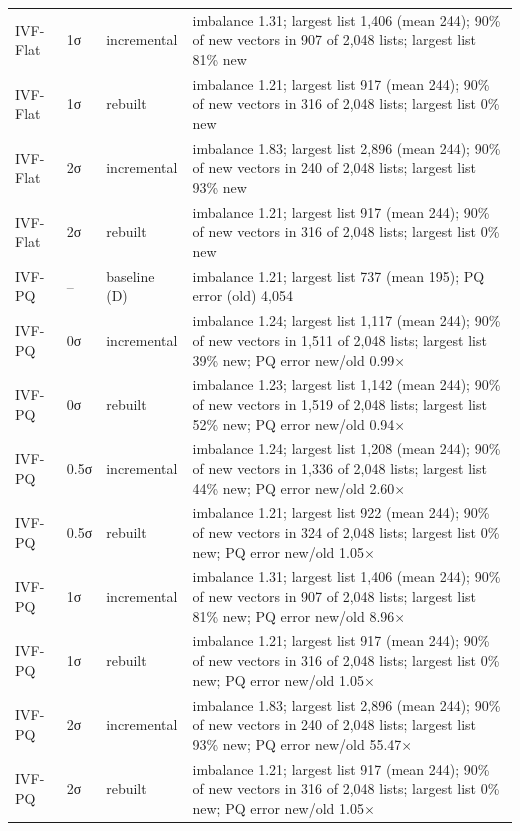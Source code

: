\begin{table}[t]
\begin{tabular}{lllp{10cm}}
IVF-Flat & 1σ & incremental & imbalance 1.31; largest list 1,406 (mean 244); 90\% of new vectors in 907 of 2,048 lists; largest list 81\% new \\
IVF-Flat & 1σ & rebuilt & imbalance 1.21; largest list 917 (mean 244); 90\% of new vectors in 316 of 2,048 lists; largest list 0\% new \\
IVF-Flat & 2σ & incremental & imbalance 1.83; largest list 2,896 (mean 244); 90\% of new vectors in 240 of 2,048 lists; largest list 93\% new \\
IVF-Flat & 2σ & rebuilt & imbalance 1.21; largest list 917 (mean 244); 90\% of new vectors in 316 of 2,048 lists; largest list 0\% new \\
IVF-PQ & -- & baseline (D) & imbalance 1.21; largest list 737 (mean 195); PQ error (old) 4,054 \\
IVF-PQ & 0σ & incremental & imbalance 1.24; largest list 1,117 (mean 244); 90\% of new vectors in 1,511 of 2,048 lists; largest list 39\% new; PQ error new/old 0.99$\times$ \\
IVF-PQ & 0σ & rebuilt & imbalance 1.23; largest list 1,142 (mean 244); 90\% of new vectors in 1,519 of 2,048 lists; largest list 52\% new; PQ error new/old 0.94$\times$ \\
IVF-PQ & 0.5σ & incremental & imbalance 1.24; largest list 1,208 (mean 244); 90\% of new vectors in 1,336 of 2,048 lists; largest list 44\% new; PQ error new/old 2.60$\times$ \\
IVF-PQ & 0.5σ & rebuilt & imbalance 1.21; largest list 922 (mean 244); 90\% of new vectors in 324 of 2,048 lists; largest list 0\% new; PQ error new/old 1.05$\times$ \\
IVF-PQ & 1σ & incremental & imbalance 1.31; largest list 1,406 (mean 244); 90\% of new vectors in 907 of 2,048 lists; largest list 81\% new; PQ error new/old 8.96$\times$ \\
IVF-PQ & 1σ & rebuilt & imbalance 1.21; largest list 917 (mean 244); 90\% of new vectors in 316 of 2,048 lists; largest list 0\% new; PQ error new/old 1.05$\times$ \\
IVF-PQ & 2σ & incremental & imbalance 1.83; largest list 2,896 (mean 244); 90\% of new vectors in 240 of 2,048 lists; largest list 93\% new; PQ error new/old 55.47$\times$ \\
IVF-PQ & 2σ & rebuilt & imbalance 1.21; largest list 917 (mean 244); 90\% of new vectors in 316 of 2,048 lists; largest list 0\% new; PQ error new/old 1.05$\times$ \\
\bottomrule
\end{tabular}
\end{table}
